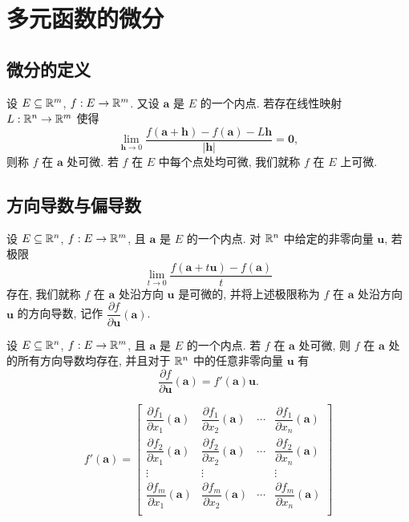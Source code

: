 \chapter{多元函数的微分}
	\section{微分的定义}
		\begin{definition}[可微]
			设 $E \subseteq \mathbb {R}^{m}$, $f:E \to \mathbb {R}^{m}$. 又设 $\bm a$ 是 $E$ 的一个内点. 若存在线性映射 $L:\mathbb {R}^{n} \to \mathbb {R}^{m}$ 使得
			$$\lim\limits_{\bm h \to 0} \dfrac{f(\bm a+\bm h)-f(\bm a)-L\bm h}{|\bm h|}=\bm 0,$$
			则称 $f$ 在 $\bm a$ 处可微. 若 $f$ 在 $E$ 中每个点处均可微, 我们就称 $f$ 在 $E$ 上可微.
		\end{definition}

	\section{方向导数与偏导数}
		\begin{definition}[方向导数]
			设 $E \subseteq \mathbb {R}^{n}$, $f:E\to \mathbb {R}^{m}$, 且 $\bm a$ 是 $E$ 的一个内点. 对 $\mathbb {R}^{n}$ 中给定的非零向量 $\bm u$, 若极限
			$$\lim\limits_{t\to0} \dfrac{f(\bm a+t\bm u)-f(\bm a)}{t}$$
			存在, 我们就称 $f$ 在 $\bm a$ 处沿方向 $\bm u$ 是可微的, 并将上述极限称为 $f$ 在 $\bm a$ 处沿方向 $\bm u$ 的方向导数, 记作 $\dfrac{\partial f}{\partial\bm u}(\bm a)$.
		\end{definition}

		\begin{proposition}
			设 $E\subseteq \mathbb {R}^{n}$, $f:E\to \mathbb {R}^{m}$, 且 $\bm a$ 是 $E$ 的一个内点. 若 $f$ 在 $\bm a$ 处可微, 则 $f$ 在 $\bm a$ 处的所有方向导数均存在, 并且对于 $\mathbb {R}^{n}$ 中的任意非零向量 $\bm u$ 有
			$$\dfrac{\partial f}{\partial \bm u}(\bm a)=f'(\bm a)\bm u.$$
		\end{proposition}

		\begin{definition}[雅可比矩阵]

			\begin{equation}\label{雅可比矩阵形式}
			f'(\bm a)=
			\begin{bmatrix}
				\dfrac{\partial f_1}{\partial x_1}(\bm a) & \dfrac{\partial f_1}{\partial x_2}(\bm a) & \cdots &  \dfrac{\partial f_1}{\partial x_n}(\bm a)\\[4mm]
				\dfrac{\partial f_2}{\partial x_1}(\bm a) & \dfrac{\partial f_2}{\partial x_2}(\bm a) & \cdots &  \dfrac{\partial f_2}{\partial x_n}(\bm a)\\[4mm]
				\vdots & \vdots &  & \vdots \\[4mm]
				\dfrac{\partial f_m}{\partial x_1}(\bm a) & \dfrac{\partial f_m}{\partial x_2}(\bm a) & \cdots &  \dfrac{\partial f_m}{\partial x_n}(\bm a)\\
			\end{bmatrix}
			\end{equation}
		\end{definition}

